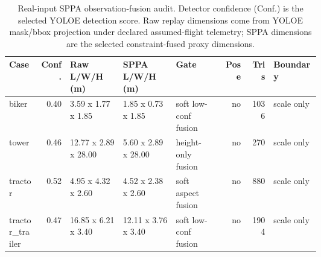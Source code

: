 \begin{table}[H]
\centering
\footnotesize
\setlength{\tabcolsep}{3pt}
\renewcommand{\arraystretch}{1.08}
\caption{Real-input SPPA observation-fusion audit. Detector confidence (Conf.) is
the selected YOLOE detection score. Raw replay dimensions come from YOLOE
mask/bbox projection under declared assumed-flight telemetry; SPPA dimensions
are the selected constraint-fused proxy dimensions.}
\label{tab:sppa-observation-fusion-audit}
\begin{tabularx}{\linewidth}{@{}L{0.105\linewidth}r L{0.17\linewidth}L{0.17\linewidth}L{0.15\linewidth}r r Y@{}}
\toprule
Case & Conf. & Raw L/W/H (m) & SPPA L/W/H (m) & Gate & Pose & Tris & Boundary \\
\midrule
biker & 0.40 & 3.59 x 1.77 x 1.85 & 1.85 x 0.73 x 1.85 & soft low-conf fusion & no & 1036 & scale only \\
tower & 0.46 & 12.77 x 2.89 x 28.00 & 5.60 x 2.89 x 28.00 & height-only fusion & no & 270 & scale only \\
tractor & 0.52 & 4.95 x 4.32 x 2.60 & 4.52 x 2.38 x 2.60 & soft aspect fusion & no & 880 & scale only \\
tractor\_\allowbreak{}trailer & 0.47 & 16.85 x 6.21 x 3.40 & 12.11 x 3.76 x 3.40 & soft low-conf fusion & no & 1904 & scale only \\
\bottomrule
\end{tabularx}
\end{table}
